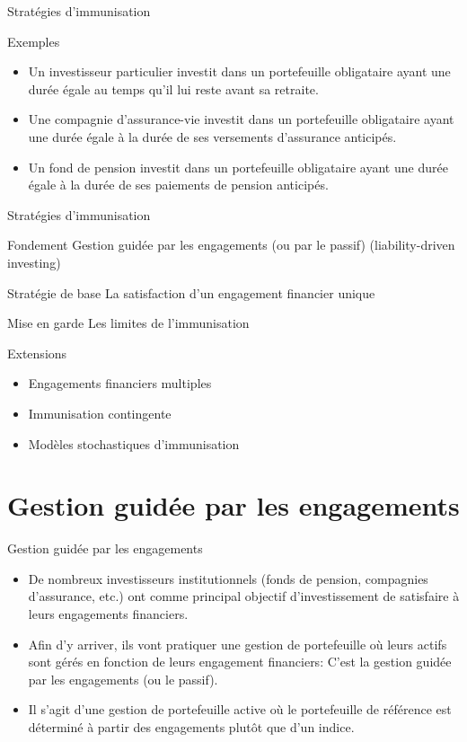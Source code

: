 \documentclass{beamer}
\begin{document}
\begin{frame}{Stratégies d’immunisation}
\begin{block}{Exemples}
\begin{itemize}[label=\bullet]
\item Un investisseur particulier investit dans un portefeuille obligataire ayant une durée égale au temps qu’il lui reste avant sa retraite.  
\item Une compagnie d’assurance-vie investit dans un portefeuille obligataire ayant une durée égale à la durée de ses versements d’assurance anticipés.  
\item Un fond de pension investit dans un portefeuille obligataire ayant une durée égale à la durée de ses paiements de pension anticipés.
\end{itemize}
\end{block}
\end{frame}

\begin{frame}{Stratégies d’immunisation}
\begin{block}{Fondement}
Gestion guidée par les engagements (ou par le passif) (liability-driven investing)
\end{block}
\begin{block}{Stratégie de base}
La satisfaction d’un engagement financier unique
\end{block}
\begin{block}{Mise en garde}
Les limites de l’immunisation
\end{block}
\begin{block}{Extensions}
\begin{itemize}[label=\bullet]
\item Engagements financiers multiples
\item Immunisation contingente
\item Modèles stochastiques d’immunisation
\end{itemize}
\end{block}
\end{frame}

\section{Gestion guidée par les engagements}

\begin{frame}{Gestion guidée par les engagements}
\begin{itemize}[label=\bullet]
\item De nombreux investisseurs institutionnels (fonds de pension, compagnies d’assurance, etc.) ont comme principal objectif d’investissement de satisfaire à leurs engagements financiers.  
\item Afin d’y arriver, ils vont pratiquer une gestion de portefeuille où leurs actifs sont gérés en fonction de leurs engagement financiers: C’est la gestion guidée par les engagements (ou le passif).
\item Il s’agit d’une gestion de portefeuille active où le portefeuille de référence est déterminé à partir des engagements plutôt que d’un indice.
\end{itemize}
\end{frame}
\end{document}
